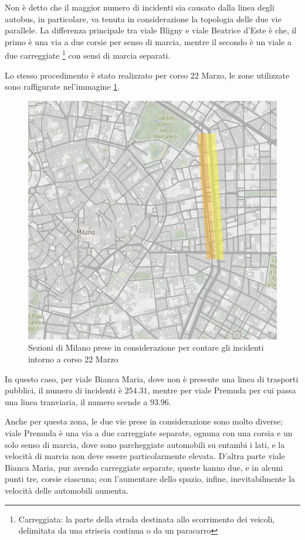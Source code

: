 \documentclass[a4paper]{report}
\begin{document}
Non è detto che il maggior numero di incidenti sia causato dalla linea degli autobus, 
in particolare, va tenuta in considerazione la topologia delle due vie parallele.
La differenza principale tra viale Bligny e viale Beatrice d'Este è che, il primo è una via a due 
corsie per senso di marcia, mentre il secondo è un viale a due carreggiate
\footnote{Carreggiata: la parte della strada destinata allo scorrimento dei veicoli, 
delimitata da una striscia continua o da un paracarro} 
con sensi di marcia separati. 

Lo stesso procedimento è stato realizzato per corso 22 Marzo, le zone utilizzate sono 
raffigurate nel'immagine \ref{fig:zona-22marzo-rect}. 

\begin{figure}
    \includegraphics[width=\linewidth]{../src/atm/zona_22marzo_rect.png}
    \caption{Sezioni di Milano prese in considerazione per contare gli incidenti intorno a corso 22 Marzo}
    \label{fig:zona-22marzo-rect}
\end{figure}

In questo caso, per viale Bianca Maria, dove non è presente una linea di trasporti pubblici, 
il numero di incidenti è $254.31$, mentre per viale Premuda per cui passa una linea tranviaria, 
il numero scende a $93.96$.

Anche per questa zona, le due vie prese in considerazione sono molto diverse; 
viale Premuda è una via a due carreggiate separate, ognuna con una corsia e un solo senso di marcia, 
dove sono parcheggiate automobili su entambi i lati, e la velocità di marcia non deve essere particolarmente 
elevata.
D'altra parte viale Bianca Maria, pur avendo carreggiate separate, queste hanno due, e in alcuni punti tre, 
corsie ciascuna; con l'aumentare dello spazio, infine, inevitabilmente la velocità delle automobili aumenta.
\end{document}
